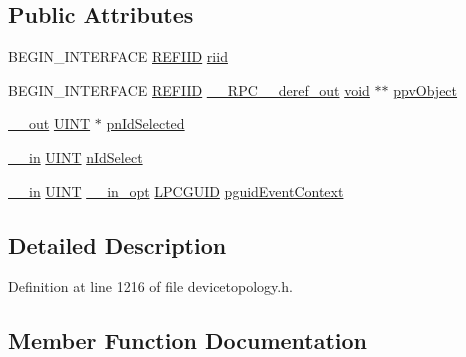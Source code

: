 \subsection*{Public Attributes}
\begin{DoxyCompactItemize}
\item 
B\+E\+G\+I\+N\+\_\+\+I\+N\+T\+E\+R\+F\+A\+CE \hyperlink{px__win__ds_8c_a80ec49c8ae61e234197d5071d2df497d}{R\+E\+F\+I\+ID} \hyperlink{struct_i_audio_output_selector_vtbl_a1f49a46ec49b5e63aab34ba778b61bc4}{riid}
\item 
B\+E\+G\+I\+N\+\_\+\+I\+N\+T\+E\+R\+F\+A\+CE \hyperlink{px__win__ds_8c_a80ec49c8ae61e234197d5071d2df497d}{R\+E\+F\+I\+ID} \hyperlink{rpcsal_8h_a23bc188526f10656f9c79d950f6c3192}{\+\_\+\+\_\+\+R\+P\+C\+\_\+\+\_\+deref\+\_\+out} \hyperlink{sound_8c_ae35f5844602719cf66324f4de2a658b3}{void} $\ast$$\ast$ \hyperlink{struct_i_audio_output_selector_vtbl_a8a1a1e0775c4e1264fafc4191b275300}{ppv\+Object}
\item 
\hyperlink{sal_8h_abb4c3c1135aab6c47cff22e7c16efb74}{\+\_\+\+\_\+out} \hyperlink{mapinls_8h_a36cb3b01d81ffd844bbbfb54003e06ec}{U\+I\+NT} $\ast$ \hyperlink{struct_i_audio_output_selector_vtbl_aaed24f792c8d79402c398ad94e5c0ee2}{pn\+Id\+Selected}
\item 
\hyperlink{sal_8h_a3f6b8655e1aa9dfc15a9029f0343009e}{\+\_\+\+\_\+in} \hyperlink{mapinls_8h_a36cb3b01d81ffd844bbbfb54003e06ec}{U\+I\+NT} \hyperlink{struct_i_audio_output_selector_vtbl_a4960360ffa9125ee9207c46a181c8201}{n\+Id\+Select}
\item 
\hyperlink{sal_8h_a3f6b8655e1aa9dfc15a9029f0343009e}{\+\_\+\+\_\+in} \hyperlink{mapinls_8h_a36cb3b01d81ffd844bbbfb54003e06ec}{U\+I\+NT} \hyperlink{sal_8h_a9c2d0f2980e51b51bb405ee2a31a3353}{\+\_\+\+\_\+in\+\_\+opt} \hyperlink{pa__win__wasapi_8c_a9c061ab1f26db8746b3dab38991f48a0}{L\+P\+C\+G\+U\+ID} \hyperlink{struct_i_audio_output_selector_vtbl_a498334cc5248ed0648e0341f89d1aa9e}{pguid\+Event\+Context}
\end{DoxyCompactItemize}


\subsection{Detailed Description}


Definition at line 1216 of file devicetopology.\+h.



\subsection{Member Function Documentation}

